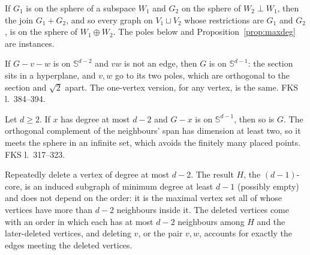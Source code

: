 \begin{lemma}
  \label{lem:sphere-sum}
  \leanok
  If $G_1$ is on the sphere of a subspace $W_1$ and $G_2$ on the sphere of
  $W_2 \perp W_1$, then the join $G_1 + G_2$, and so every graph on $V_1 \sqcup V_2$ whose
  restrictions are $G_1$ and $G_2$, is on the sphere of $W_1 \oplus W_2$. The poles below and
  Proposition~\ref{prop:maxdeg} are instances.
\end{lemma}

\begin{lemma}[Poles]
  \label{lem:poles}
  \leanok
  If $G - v - w$ is on $\mathbb{S}^{d-2}$ and $vw$ is not an edge, then $G$ is on
  $\mathbb{S}^{d-1}$: the section sits in a hyperplane, and $v, w$ go to its two poles, which
  are orthogonal to the section and $\sqrt 2$ apart. The one-vertex version, for any
  vertex, is the same. FKS l.~384--394.
\end{lemma}

\begin{lemma}
  \label{lem:sphere-extend}
  \leanok
  Let $d \ge 2$. If $x$ has degree at most $d - 2$ and $G - x$ is on $\mathbb{S}^{d-1}$, then
  so is $G$. The orthogonal complement of the neighbours' span has dimension at least two, so
  it meets the sphere in an infinite set, which avoids the finitely many placed points.
  FKS l.~317--323.
\end{lemma}

\begin{lemma}
  \label{lem:core}
  \leanok
  Repeatedly delete a vertex of degree at most $d - 2$. The result $H$, the $(d-1)$-core, is
  an induced subgraph of minimum degree at least $d - 1$ (possibly empty) and does not depend
  on the order: it is the maximal vertex set all of whose vertices have more than $d - 2$
  neighbours inside it. The deleted vertices come with an order in which each has at most
  $d - 2$ neighbours among $H$ and the later-deleted vertices, and deleting $v$, or the pair
  $v, w$, accounts for exactly the edges meeting the deleted vertices.
\end{lemma}

